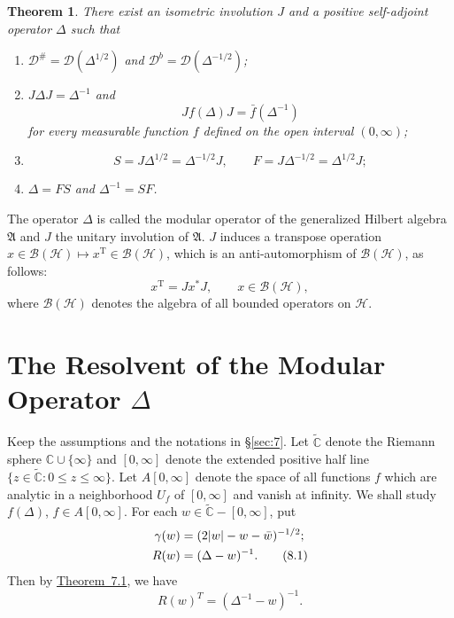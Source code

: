 \documentclass[12pt,b5paper,twoside]{article}
\theoremstyle{takesaki}
\newtheorem{theorem}{Theorem}[section]
\numberwithin{equation}{section}
\begin{document}
\begin{theorem}\label{thm:7.1}
There exist an isometric involution $J$ and a positive self-adjoint
operator $\Delta$ such that
\begin{enumerate}[label=(\roman*)]
 \item $\mathcal D^\#=\mathcal D(\Delta^{1/2})$ and
 $\mathcal D^b=\mathcal D(\Delta^{-1/2})$;

 \item $J\Delta J=\Delta^{-1}$ and
 \[
  Jf(\Delta)J=\bar f(\Delta^{-1})
 \]
 for every measurable function $f$ defined on the open interval
 $(0,\infty)$;
 \item
 \[
  S=J\Delta^{1/2}=\Delta^{-1/2}J,
  \qquad
  F=J\Delta^{-1/2}=\Delta^{1/2}J;
 \]
 \item $\Delta=FS$ and $\Delta^{-1}=SF$.
\end{enumerate}
\end{theorem}

The operator $\Delta$ is called the modular operator of the generalized
Hilbert algebra $\mathfrak A$ and $J$ the unitary involution of
$\mathfrak A$.  $J$ induces a transpose operation
$x\in\mathcal B(\mathcal H)\mapsto x^{\mathrm T}\in\mathcal B(\mathcal H)$,
which is an anti-automorphism of $\mathcal B(\mathcal H)$, as follows:
\begin{equation}
 x^{\mathrm T}=Jx^*J,\qquad x\in\mathcal B(\mathcal H),
 \tag{7.10}\label{eq:7.10}
\end{equation}
where $\mathcal B(\mathcal H)$ denotes the algebra of all bounded
operators on $\mathcal H$.

\section{The Resolvent of the Modular Operator \texorpdfstring{$\Delta$}{Delta}}
\label{sec:8}

Keep the assumptions and the notations in \S\ref{sec:7}.  Let
$\widetilde{\mathbb C}$ denote the Riemann sphere
$\mathbb C\cup\{\infty\}$ and $[0,\infty]$ denote the extended positive
half line
$\{z\in\widetilde{\mathbb C}:0\leq z\leq\infty\}$.  Let
$A[0,\infty]$ denote the space of all functions $f$ which are analytic
in a neighborhood $U_f$ of $[0,\infty]$ and vanish at infinity.  We
shall study $f(\Delta)$, $f\in A[0,\infty]$.  For each
$w\in\widetilde{\mathbb C}-[0,\infty]$, put
\begin{align}
 \gamma(w)&=(2|w|-w-\bar w)^{-1/2};\notag\\
 R(w)&=(\Delta-w)^{-1}.
 \tag{8.1}\label{eq:8.1}
\end{align}
Then by \hyperref[thm:7.1]{Theorem~7.1}, we have
\begin{equation}
  R(w)^T=(\Delta^{-1}-w)^{-1}.
  \tag{8.2}\label{eq:8.2}
\end{equation}
\end{document}

